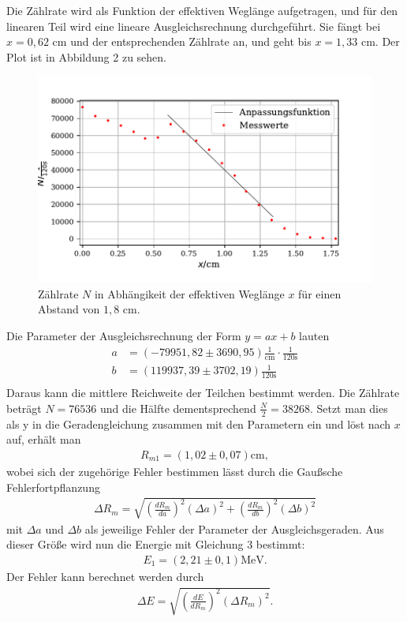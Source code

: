 \noindent Die Zählrate wird als Funktion der effektiven Weglänge aufgetragen, und für den linearen Teil wird eine lineare Ausgleichsrechnung durchgeführt. 
Sie fängt bei $x=0,62$ $\si{\cm}$ und der entsprechenden Zählrate an, und geht bis $x=1,33$ $\si{\cm}$.
Der Plot ist in Abbildung 2 zu sehen.
\begin{figure}[H]
  \centering
  \includegraphics{plot1.pdf}
  \caption{Zählrate $N$ in Abhängikeit der effektiven Weglänge $x$ für einen Abstand von $1,8$ $\si{\cm}$. }
  \label{fig:plot}
\end{figure}

\noindent Die Parameter der Ausgleichsrechnung der Form $y=ax+b$ lauten
\begin{align*}
a &=  (-79951,82 \pm 3690,95) \frac{1}{\si{\centi\meter}}\cdot \frac{1}{120\si{\second}} \\
b &= (119937,39 \pm 3702,19) \frac{1}{120\si{\second}} \\
\end{align*}
Daraus kann die mittlere Reichweite der Teilchen bestimmt werden. Die Zählrate beträgt $N=76536$ und die Hälfte dementsprechend $\frac{N}{2}=38268$. Setzt man dies als y in die Geradengleichung zusammen mit den Parametern ein und löst nach $x$ auf, erhält man
\begin{align*}
R_{m1} = (1,02 \pm 0,07) \si{\centi\meter},
\end{align*}
wobei sich der zugehörige Fehler bestimmen lässt durch die Gaußsche Fehlerfortpflanzung
\begin{align*}
\Delta R_{m} = \sqrt{(\frac{dR_m}{da})^2 (\Delta a)^2 + (\frac{dR_m}{db})^2 (\Delta b)^2}
\end{align*}
mit $\Delta a $ und $\Delta b$ als jeweilige Fehler der Parameter der Ausgleichsgeraden.
Aus dieser Größe wird nun die Energie mit Gleichung 3 bestimmt:
\begin{align*}
E_{1} = (2,21 \pm 0,1) \si{\MeV}.
\end{align*}
Der Fehler kann berechnet werden durch
\begin{align*}
\Delta E = \sqrt{(\frac{dE}{dR_m})^2 (\Delta R_m)^2 }.
\end{align*}



